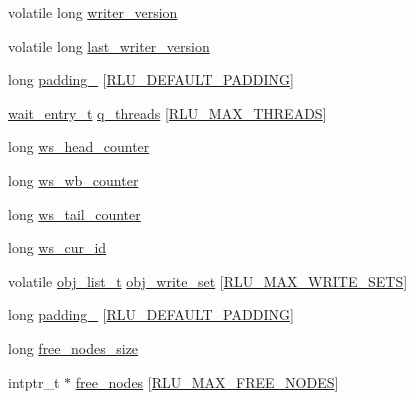 \begin{DoxyCompactItemize}
\item 
volatile long \hyperlink{structrlu__thread__data_a9aa03c237e23a780a415a2cd00e7b754}{writer\+\_\+version}
\item 
volatile long \hyperlink{structrlu__thread__data_a5f0720b2f9ca2327e77a2c8bf3fc6cff}{last\+\_\+writer\+\_\+version}
\item 
long \hyperlink{structrlu__thread__data_a4c6ae226f879a355165953bbbb5d1e99}{padding\+\_} \mbox{[}\hyperlink{rlu_8h_a52e9bd0565eaf64830bc7e85dde5f5cb}{R\+L\+U\+\_\+\+D\+E\+F\+A\+U\+L\+T\+\_\+\+P\+A\+D\+D\+I\+NG}\mbox{]}
\item 
\hyperlink{rlu_8h_ac547e16d21c2e118a24c05808c00f647}{wait\+\_\+entry\+\_\+t} \hyperlink{structrlu__thread__data_adc4ec9312cf5ffec29f6b754f0f52e1c}{q\+\_\+threads} \mbox{[}\hyperlink{rlu_8h_ac652bd82ef9dbb2f1caa3fde5aac0342}{R\+L\+U\+\_\+\+M\+A\+X\+\_\+\+T\+H\+R\+E\+A\+DS}\mbox{]}
\item 
long \hyperlink{structrlu__thread__data_a9903b6c56b5d29a490b29cac6c8a4618}{ws\+\_\+head\+\_\+counter}
\item 
long \hyperlink{structrlu__thread__data_a3df86ec9553b9f02863953e401b40a3d}{ws\+\_\+wb\+\_\+counter}
\item 
long \hyperlink{structrlu__thread__data_a78a6017eff847fa8ea911c0cc872a703}{ws\+\_\+tail\+\_\+counter}
\item 
long \hyperlink{structrlu__thread__data_a4880c9e3ba05861f5e61352a68025d75}{ws\+\_\+cur\+\_\+id}
\item 
volatile \hyperlink{rlu_8h_aa40041a4e841917201bb69f0eb22bbd8}{obj\+\_\+list\+\_\+t} \hyperlink{structrlu__thread__data_a13a84fcdbcde59c82753123a1504dc86}{obj\+\_\+write\+\_\+set} \mbox{[}\hyperlink{rlu_8h_a2691d3248435c1cb153c0f6212828599}{R\+L\+U\+\_\+\+M\+A\+X\+\_\+\+W\+R\+I\+T\+E\+\_\+\+S\+E\+TS}\mbox{]}
\item 
long \hyperlink{structrlu__thread__data_ad99ac9d070599c170be24c096931eaa4}{padding\+\_} \mbox{[}\hyperlink{rlu_8h_a52e9bd0565eaf64830bc7e85dde5f5cb}{R\+L\+U\+\_\+\+D\+E\+F\+A\+U\+L\+T\+\_\+\+P\+A\+D\+D\+I\+NG}\mbox{]}
\item 
long \hyperlink{structrlu__thread__data_a325dadbf34f223fa1f92d91ca3814675}{free\+\_\+nodes\+\_\+size}
\item 
intptr\+\_\+t $\ast$ \hyperlink{structrlu__thread__data_a44b3c5b3c0b42a7cd0bc0db1f0f2b2d9}{free\+\_\+nodes} \mbox{[}\hyperlink{rlu_8h_adddd843b034425fcae964e749834af44}{R\+L\+U\+\_\+\+M\+A\+X\+\_\+\+F\+R\+E\+E\+\_\+\+N\+O\+D\+ES}\mbox{]}
\item 

\end{DoxyCompactItemize}
